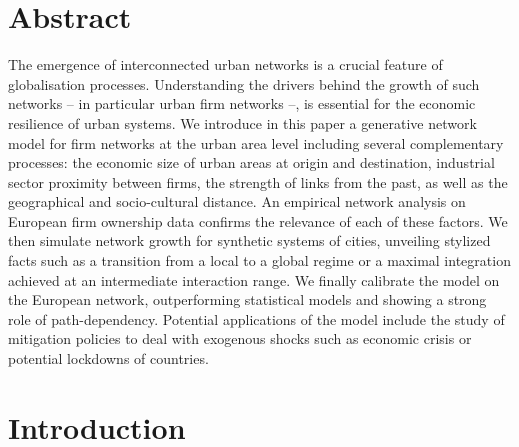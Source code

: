 \documentclass[10pt,letterpaper]{article}
\begin{document}
\section*{Abstract}
The emergence of interconnected urban networks is a crucial feature of globalisation processes. Understanding the drivers behind the growth of such networks -- in particular urban firm networks --, is essential for the economic resilience of urban systems. We introduce in this paper a generative network model for firm networks at the urban area level including several complementary processes: the economic size of urban areas at origin and destination, industrial sector proximity between firms, the strength of links from the past, as well as the geographical and socio-cultural distance. An empirical network analysis on European firm ownership data confirms the relevance of each of these factors. We then simulate network growth for synthetic systems of cities, unveiling stylized facts such as a transition from a local to a global regime or a maximal integration achieved at an intermediate interaction range. We finally calibrate the model on the European network, outperforming statistical models and showing a strong role of path-dependency. Potential applications of the model include the study of mitigation policies to deal with exogenous shocks such as economic crisis or potential lockdowns of countries.

\linenumbers


\section*{Introduction}
\end{document}
